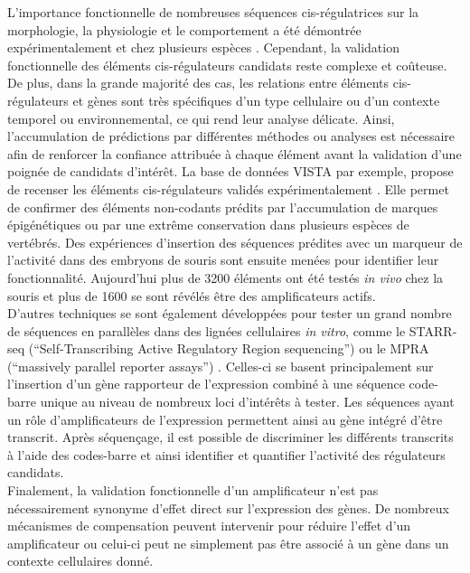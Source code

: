 L’importance fonctionnelle de nombreuses séquences \gls{cis}-régulatrices sur la morphologie, la physiologie et le comportement a été démontrée expérimentalement et chez plusieurs espèces \citep{wray_evolutionary_2007}. Cependant, la validation fonctionnelle des éléments \gls{cis}-régulateurs candidats reste complexe et coûteuse. De plus, dans la grande majorité des cas, les relations entre éléments \gls{cis}-régulateurs et gènes sont très spécifiques d’un type cellulaire ou d’un contexte temporel ou environnemental, ce qui rend leur analyse délicate. Ainsi, l’accumulation de prédictions par différentes méthodes ou analyses est nécessaire afin de renforcer la confiance attribuée à chaque élément avant la validation d’une poignée de candidats d’intérêt. La base de données VISTA par exemple, propose de recenser les éléments \gls{cis}-régulateurs validés expérimentalement \citep{visel_vista_2007}. Elle permet de confirmer des éléments non-codants prédits par l’accumulation de marques épigénétiques ou par une extrême conservation dans plusieurs espèces de vertébrés. Des expériences d’insertion des séquences prédites avec un marqueur de l’activité dans des embryons de souris sont ensuite menées pour identifier leur fonctionnalité. Aujourd’hui plus de 3200 éléments ont été testés \textit{in vivo} chez la souris et plus de 1600 se sont révélés être des \glspl{amplificateur} actifs. \\

D’autres techniques se sont également développées pour tester un grand nombre de séquences en parallèles dans des lignées cellulaires \textit{in vitro}, comme le STARR-seq (“Self-Transcribing Active Regulatory Region sequencing”) ou le MPRA (“massively parallel reporter assays”) \citep{arnold_quantitative_2014, inoue_decoding_2015}. Celles-ci se basent principalement sur l’insertion d’un gène rapporteur de l’expression combiné à une séquence code-barre unique au niveau de nombreux loci d’intérêts à tester. Les séquences ayant un rôle d’\glspl{amplificateur} de l’expression permettent ainsi au gène intégré d’être transcrit.  Après séquençage, il est possible de discriminer les différents transcrits à l’aide des codes-barre et ainsi identifier et quantifier l’activité des régulateurs candidats. \\

Finalement, la validation fonctionnelle d’un \gls{amplificateur} n’est pas nécessairement synonyme d’effet direct sur l’expression des gènes. De nombreux mécanismes de compensation peuvent intervenir pour réduire l’effet d’un \gls{amplificateur} ou celui-ci peut ne simplement pas être associé à un gène dans un contexte cellulaires donné.

